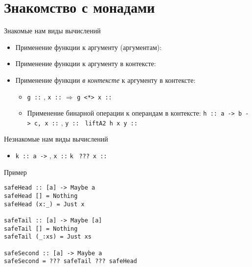\documentclass{beamer}
\newcommand{\hs}[1]{\texttt{#1}}
\newcommand{\bhs}[1]{\fbox{\texttt{#1}}}
\begin{document}
  \section{Знакомство с монадами}
  \begin{frame}[fragile]{Знакомые нам виды вычислений}
      \begin{itemize}
          \item Применение функции к аргументу (аргументам):
          \item Применение функции к аргументу в контексте:
          \item Применение функции \textit{в контексте} к аргументу в контексте:
          \begin{itemize}
              \item \hs{g ::} \bhs{a -> b}, \hs{x ::} \bhs{a} $\Rightarrow$ \hs{g <*> x ::} \bhs{b}
              \item Применение бинарной операции к операндам в контексте:
                  \hs{h :: a -> b -> c, x ::} \bhs{a}, \hs{y :: } \bhs{b} \Rightarrow \hs{liftA2 h x y ::} \bhs{c}
          \end{itemize}
      \end{itemize}
  \end{frame}
  \begin{frame}[fragile]{Незнакомые нам виды вычислений}
      \begin{itemize}
          \item \hs{k :: a ->} \bhs{b}, \hs{x ::} \bhs{a} \Rightarrow \hs{k}~ \alert{\texttt{???}}~\hs{x ::}~\bhs{b}
      \end{itemize}
      \begin{block}{Пример}
      \begin{verbatim}
safeHead :: [a] -> Maybe a
safeHead [] = Nothing
safeHead (x:_) = Just x

safeTail :: [a] -> Maybe [a]
safeTail [] = Nothing
safeTail (_:xs) = Just xs

safeSecond :: [a] -> Maybe a
safeSecond = ??? safeTail ??? safeHead
      \end{verbatim}
      \end{block}
  \end{frame}
\end{document}
